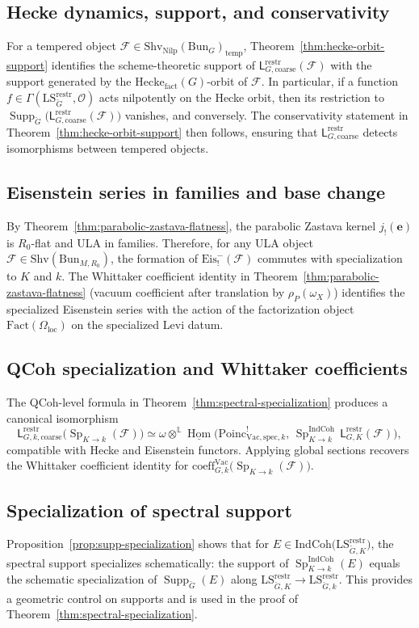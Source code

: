 \documentclass[11pt]{article}
\newcommand{\Sp}{\operatorname{Sp}}
\newcommand{\IndCoh}{\mathrm{IndCoh}}
\newcommand{\Nilp}{\mathrm{Nilp}}
\newcommand{\LS}{\mathrm{LS}}
\newcommand{\Shv}{\mathrm{Shv}}
\newcommand{\Bun}{\mathrm{Bun}}
\newcommand{\restr}{\mathrm{restr}}
\newcommand{\coarse}{\mathrm{coarse}}
\newcommand{\cF}{\mathcal{F}}
\newcommand{\Vac}{\mathrm{Vac}}
\newcommand{\Poinc}{\mathrm{Poinc}}
\newcommand{\spec}{\mathrm{spec}}
\newcommand{\coeff}{\mathrm{coeff}}
\theoremstyle{plain}
\theoremstyle{definition}
\theoremstyle{remark}
\begin{document}
\subsection{Hecke dynamics, support, and conservativity}
For a tempered object $\cF\in\Shv_{\Nilp}(\Bun_G)_{\mathrm{temp}}$, Theorem~\ref{thm:hecke-orbit-support} identifies the scheme-theoretic support of $\mathsf L^{\restr}_{G,\coarse}(\cF)$ with the support generated by the $\mathrm{Hecke}_{\mathrm{fact}}(G)$-orbit of $\cF$. In particular, if a function $f\in\Gamma(\LS^{\restr}_{\check G},\mathcal O)$ acts nilpotently on the Hecke orbit, then its restriction to $\operatorname{Supp}_{\check G}\big(\mathsf L^{\restr}_{G,\coarse}(\cF)\big)$ vanishes, and conversely. The conservativity statement in Theorem~\ref{thm:hecke-orbit-support} then follows, ensuring that $\mathsf L^{\restr}_{G,\coarse}$ detects isomorphisms between tempered objects.

\subsection{Eisenstein series in families and base change}
By Theorem~\ref{thm:parabolic-zastava-flatness}, the parabolic Zastava kernel $j_!(\boldsymbol e)$ is $R_0$-flat and ULA in families. Therefore, for any ULA object $\mathcal F\in\Shv(\Bun_{M,R_0})$, the formation of $\mathrm{Eis}^-_{!}(\mathcal F)$ commutes with specialization to $K$ and $k$. The Whittaker coefficient identity in Theorem~\ref{thm:parabolic-zastava-flatness} (vacuum coefficient after translation by $\rho_P(\omega_X)$) identifies the specialized Eisenstein series with the action of the factorization object $\mathrm{Fact}(\Omega_{\mathrm{loc}})$ on the specialized Levi datum.

\subsection{QCoh specialization and Whittaker coefficients}
The QCoh-level formula in Theorem~\ref{thm:spectral-specialization} produces a canonical isomorphism
\[
\mathsf L^{\restr}_{G,k,\coarse}\big(\Sp_{K\to k}(\cF)\big)
\simeq
\omega\otimes^{\mathbb L}\underline{\operatorname{Hom}}\Big(\Poinc^{!}_{\Vac,\spec,k},\,\Sp^{\IndCoh}_{K\to k}\,\mathsf L^{\restr}_{G,K}(\cF)\Big),
\]
compatible with Hecke and Eisenstein functors. Applying global sections recovers the Whittaker coefficient identity for $\coeff^{\Vac}_{G,k}\big(\Sp_{K\to k}(\cF)\big)$.

\subsection{Specialization of spectral support}
Proposition~\ref{prop:supp-specialization} shows that for $E\in\IndCoh\big(\LS^{\restr}_{\check G,K}\big)$, the spectral support specializes schematically: the support of $\Sp^{\IndCoh}_{K\to k}(E)$ equals the schematic specialization of $\operatorname{Supp}_{\check G}(E)$ along $\LS^{\restr}_{\check G,K}\to\LS^{\restr}_{\check G,k}$. This provides a geometric control on supports and is used in the proof of Theorem~\ref{thm:spectral-specialization}.
\end{document}
